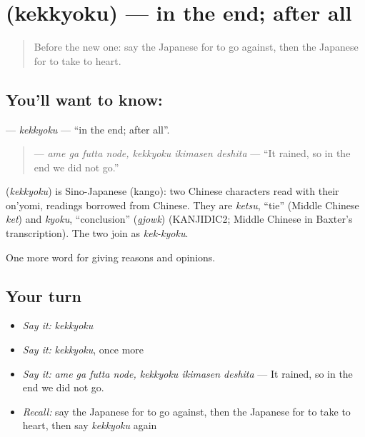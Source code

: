 \section[\texorpdfstring{\ja{けっきょく} (kekkyoku)}{けっきょく (kekkyoku)}]{ (kekkyoku) — in the end; after all}

\label{lesson:JA-C325-kekkyoku}



\begin{quote}
Before the new one: say the Japanese for to go against, then the Japanese for to take to heart.
\end{quote}

\subsection*{You'll want to know: }
\textbf{} — \emph{kekkyoku} — \textquotedblleft{}in the end; after all\textquotedblright{}.

\begin{quote}
\textbf{  } — \emph{ame ga futta node, kekkyoku ikimasen deshita} — \textquotedblleft{}It rained, so in the end we did not go.\textquotedblright{}
\end{quote}

\begin{cousinweb}
\textbf{} (\emph{kekkyoku}) is Sino-Japanese (kango): two Chinese characters read with their on'yomi, readings borrowed from Chinese. They are \emph{ketsu}, \textquotedblleft{}tie\textquotedblright{} (Middle Chinese \emph{ket}) and \emph{kyoku}, \textquotedblleft{}conclusion\textquotedblright{} (\emph{gjowk}) (KANJIDIC2; Middle Chinese in Baxter's transcription). The two join as \emph{kek-kyoku}.
\end{cousinweb}

\begin{grammarlens}[title={What you've built}]
One more word for giving reasons and opinions.
\end{grammarlens}

\subsection*{Your turn}
\begin{itemize}
\raggedright
  \item \emph{Say it:} \emph{kekkyoku}
  \item \emph{Say it:} \emph{kekkyoku}, once more
  \item \emph{Say it:} \emph{ame ga futta node, kekkyoku ikimasen deshita} — It rained, so in the end we did not go.
  \item \emph{Recall:} say the Japanese for to go against, then the Japanese for to take to heart, then say \emph{kekkyoku} again
\end{itemize}

